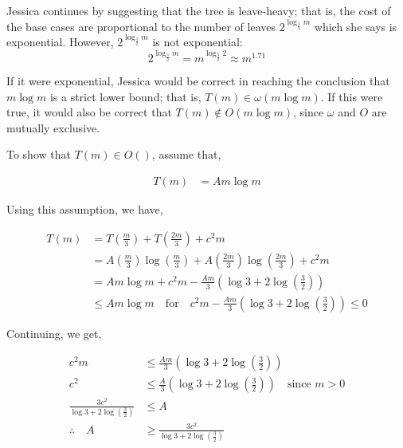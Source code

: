 Jessica continues by suggesting that the tree is leave-heavy; that is, the cost of the base cases are proportional to the number of leaves $2^{\log_{\frac{3}{2}}{m}}$ which she says is exponential. However, $2^{\log_{\frac{3}{2}}{m}}$ is not exponential:
$$
    2^{\log_{\frac{3}{2}}{m}} = m^{\log_{\frac{3}{2}}{2}} \approx m^{1.71}
$$

If it were exponential, Jessica would be correct in reaching the conclusion that $m \log{m}$ is a strict lower bound; that is, $T(m) \in \omega (m \log{m})$. If this were true, it would also be correct that $T(m) \notin O(m \log{m})$, since $\omega$ and $O$ are mutually exclusive.



To show that $T\left(m\right) \in O\left(  \right)$, assume that,

\begin{align*}
    T(m) & = A m \log{m}
\end{align*}

Using this assumption, we have,

\begin{align*}
    T(m) & = T\left(\frac{m}{3}\right) + T\left(\frac{2m}{3}\right) + c^2m                                                                         \\
         & = A \left(\frac{m}{3} \right) \log{\left( \frac{m}{3} \right)} + A \left(\frac{2m}{3} \right) \log{\left( \frac{2m}{3} \right)} + c^2 m \\
         & = A m \log{m} + c^2 m - \frac{Am}{3} \left( \log{3} + 2\log{\left( \frac{3}{2} \right)} \right)                                         \\
         & \le A m \log{m} \quad \text{for} \quad c^2 m - \frac{Am}{3} \left( \log{3} + 2\log{\left( \frac{3}{2} \right)} \right) \le 0
\end{align*}

Continuing, we get,

\begin{align*}
    c^2 m                                                    & \le \frac{Am}{3} \left( \log{3} + 2\log{\left( \frac{3}{2} \right)} \right)                           \\
    c^2                                                      & \le \frac{A}{3} \left( \log{3} + 2\log{\left( \frac{3}{2} \right)} \right) \quad \text{since $m > 0$} \\
    \frac{3c^2}{\log{3} + 2\log{\left( \frac{3}{2} \right)}} & \le A                                                                                                 \\
    \therefore \quad A                                       & \ge \frac{3c^2}{\log{3} + 2\log{\left( \frac{3}{2} \right)}}                                          \\
\end{align*}


